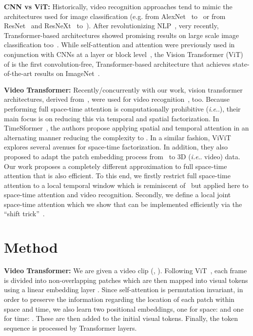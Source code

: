 \documentclass{article}
\makeatletter
\DeclareRobustCommand\onedot{\futurelet\@let@token\@onedot}
\def\@onedot{\ifx\@let@token.\else.\null\fi\xspace}
\def\ie{\emph{i.e}\onedot} \def\Ie{\emph{I.e}\onedot}
\makeatother
\begin{document}
\textbf{CNN vs ViT:} Historically, video recognition approaches tend to mimic the architectures used for image classification (e.g. from AlexNet~\citep{krizhevsky2012imagenet} to~\citep{karpathy2014large} or from ResNet~\citep{he2016deep} and ResNeXt~\citep{xie2017aggregated} to~\citep{feichtenhofer2019slowfast}). After revolutionizing NLP~\citep{vaswani2017attention,raffel2019exploring}, very recently, Transformer-based architectures showed promising results on large scale image classification too~\citep{dosovitskiy2020image}. While self-attention and attention were previously used in conjunction with CNNs at a layer or block level~\citep{chen20182,zhang2019self,srinivas2021bottleneck}, the Vision Transformer (ViT) of \citet{dosovitskiy2020image} is the first convolution-free, Transformer-based architecture that achieves state-of-the-art results on ImageNet~\citep{deng2009imagenet}.

\textbf{Video Transformer:} Recently/concurrently with our work, vision transformer architectures, derived from~\citep{dosovitskiy2020image}, were used for video recognition~\citep{bertasius2021space,arnab2021vivit}, too. Because performing full space-time attention is computationally prohibitive (\ie ), their main focus is on reducing this via temporal and spatial factorization. In TimeSformer~\citep{bertasius2021space}, the authors propose  applying spatial and temporal attention in an alternating manner reducing the complexity to . In a similar fashion, ViViT~\citep{arnab2021vivit} explores several avenues for space-time factorization. In addition, they also proposed to adapt the patch embedding process from~\citep{dosovitskiy2020image} to 3D (\ie video) data. Our work proposes a completely different approximation to full space-time attention that is also efficient. To this end, we firstly restrict full space-time attention to a local temporal window which is reminiscent of~\citep{beltagy2020longformer} but applied here to space-time attention and video recognition. Secondly, we define a local joint space-time attention which we show that can be implemented efficiently via the ``shift trick''~\citep{wu2018shift}.

\section{Method}\label{sec:method}

\textbf{Video Transformer:} We are given a video clip  (, ). Following ViT~\citep{dosovitskiy2020image}, each frame is divided into  non-overlapping patches which are then mapped into visual tokens using a linear embedding layer .  Since self-attention is permutation invariant, in order to preserve the information regarding the location of each patch within space and time, we also learn two positional embeddings, one for space:  and one for time: . These are then added to the initial visual tokens. Finally, the token sequence is processed by  Transformer layers.
\end{document}
